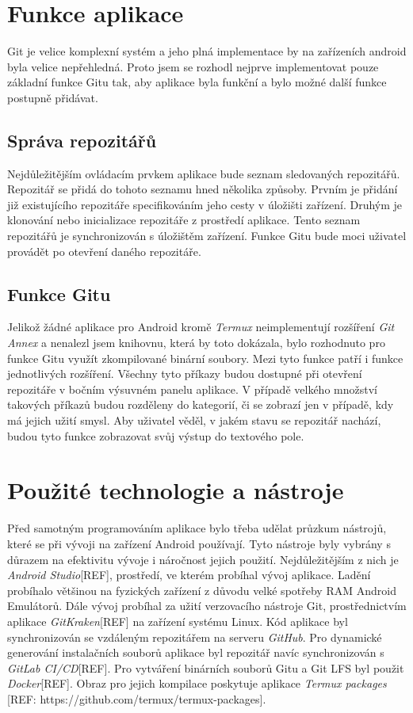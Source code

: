     \section{Funkce aplikace}
        Git je velice komplexní systém a jeho plná implementace by na zařízeních android byla velice nepřehledná. Proto jsem se rozhodl nejprve implementovat pouze základní funkce Gitu tak, aby aplikace byla funkční a bylo možné další funkce postupně přidávat.

        \subsection{Správa repozitářů}
        Nejdůležitějším ovládacím prvkem aplikace bude seznam sledovaných repozitářů. Repozitář se přidá do tohoto seznamu hned několika způsoby. Prvním je přidání již existujícího repozitáře specifikováním jeho cesty v úložišti zařízení. Druhým je klonování nebo inicializace repozitáře z prostředí aplikace. Tento seznam repozitářů je synchronizován s úložištěm zařízení. Funkce Gitu bude moci uživatel provádět po otevření daného repozitáře.

        \subsection{Funkce Gitu}
        Jelikož žádné aplikace pro Android kromě \emph{Termux} neimplementují rozšíření \emph{Git Annex} a nenalezl jsem knihovnu, která by toto dokázala, bylo rozhodnuto pro funkce Gitu využít zkompilované binární soubory. Mezi tyto funkce patří i funkce jednotlivých rozšíření. Všechny tyto příkazy budou dostupné při otevření repozitáře v bočním výsuvném panelu aplikace. V případě velkého množství takových příkazů budou rozděleny do kategorií, či se zobrazí jen v případě, kdy má jejich užití smysl. Aby uživatel věděl, v jakém stavu se repozitář nachází, budou tyto funkce zobrazovat svůj výstup do textového pole.

    \section{Použité technologie a nástroje}
        Před samotným programováním aplikace bylo třeba udělat průzkum nástrojů, které se při vývoji na zařízení Android používají. Tyto nástroje byly vybrány s důrazem na efektivitu vývoje i náročnost jejich použití. Nejdůležitějším z nich je \emph{Android Studio}[REF], prostředí, ve kterém probíhal vývoj aplikace. Ladění probíhalo většinou na fyzických zařízení z důvodu velké spotřeby RAM Android Emulátorů. Dále vývoj probíhal za užití verzovacího nástroje Git, prostřednictvím aplikace \emph{GitKraken}[REF] na zařízení systému Linux. Kód aplikace byl synchronizován se vzdáleným repozitářem na serveru \emph{GitHub}. Pro dynamické generování instalačních souborů aplikace byl repozitář navíc synchronizován s \emph{GitLab CI/CD}[REF]. Pro vytváření binárních souborů Gitu a Git LFS byl použit \emph{Docker}[REF]. Obraz pro jejich kompilace poskytuje aplikace \emph{Termux packages} [REF: https://github.com/termux/termux-packages].

